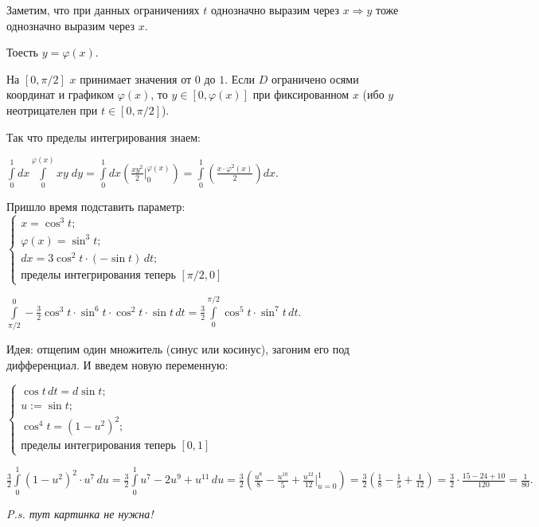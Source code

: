 \documentclass[a4paper, fleqn]{article}
\begin{document}
    Заметим, что при данных ограничениях $t$ однозначно выразим через $x \Rightarrow y$  тоже однозначно выразим через $x$.
    
    Тоесть $y = \varphi(x)$.
    
    На $[0, \pi/2]$ $x$ принимает значения от $0$ до $1$. Если $D$ ограничено осями координат и графиком $\varphi(x)$, то $y \in [0, \varphi(x)]$ при фиксированном $x$  (ибо $y$ неотрицателен при $t \in [0, \pi/2]$).
     
     Так что пределы интегрирования знаем:
     
     $\int\limits_{0}^{1} dx \int\limits_{0}^{\varphi(x)} xy \; dy = \int\limits_{0}^{1} dx \left( \frac{xy^2}{2}  \Bigg|_{0}^{\varphi(x)}
     \right)  = \int\limits_{0}^{1}  \left( \frac{x \cdot \varphi^2(x)}{2}\right) dx.$
     
     Пришло время подставить параметр: $\begin{cases} x = \cos^3 t;\\
     \varphi(x) = \sin^3 t;\\
     dx = 3 \cos^2 t \cdot (-\sin t) \, dt;\\
     \text{пределы интегрирования теперь } [\pi/2, 0]
     \end{cases}$
     
     $\int\limits_{\pi/2}^{0} -\frac{3}{2} \cos^3 t \cdot \sin^6 t \cdot \cos^2 t \cdot \sin t \, dt = \frac{3}{2} \int\limits_{0}^{\pi/ 2} \cos^5 t\cdot \sin^7 t \, dt.$
     
     Идея: отщепим один множитель (синус или косинус), загоним его под дифференциал. И введем новую переменную:
     
     $\begin{cases}
     \cos t \,dt = d \sin t;\\
     u := \sin t;\\
     \cos ^ 4 t = (1 - u^2)^2;\\
     \text{пределы интегрирования теперь } [0, 1]
     \end{cases}$
    
    $\frac{3}{2} \int\limits_{0}^{1} (1 - u^2)^2 \cdot u^7 \, du = \frac{3}{2} \int\limits_{0}^{1} u^7 - 2 u^9 + u^{11} \, du = \frac{3}{2} \left( \frac{u^8}{8} - \frac{u^{10}}{5} + \frac{u^{12}}{12} \Bigg|_{u = 0}^{1}\right) = \frac{3}{2} \left(\frac{1}{8} - \frac{1}{5} + \frac{1}{12}\right) = \frac{3}{2} \cdot \frac{15 - 24 + 10}{120} = \frac{1}{80}.$
    
    \textit{P.s. тут картинка не нужна!}
    
\end{document}
